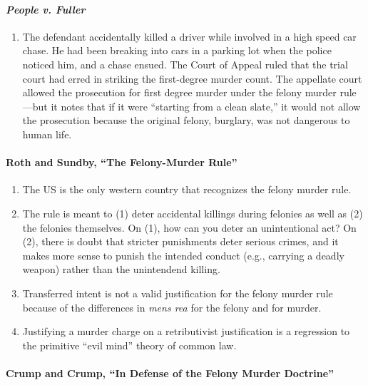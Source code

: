 \paragraph{\emph{People v. Fuller}} 

\begin{enumerate}
    \item The defendant accidentally killed a driver while involved in a high speed car chase. He had been breaking into cars in a parking lot when the police noticed him, and a chase ensued. The Court of Appeal ruled that the trial court had erred in striking the first-degree murder count. The appellate court allowed the prosecution for first degree murder under the felony murder rule---but it notes that if it were ``starting from a clean slate,'' it would not allow the prosecution because the original felony, burglary, was not dangerous to human life.
\end{enumerate}

\paragraph{Roth and Sundby, ``The Felony-Murder Rule''}

\begin{enumerate}
    \item The US is the only western country that recognizes the felony murder rule.
    \item The rule is meant to (1) deter accidental killings during felonies as well as (2) the felonies themselves. On (1), how can you deter an unintentional act? On (2), there is doubt that stricter punishments deter serious crimes, and it makes more sense to punish the intended conduct (e.g., carrying a deadly weapon) rather than the unintendend killing.
    \item Transferred intent is not a valid justification for the felony murder rule because of the differences in \emph{mens rea} for the felony and for murder.
    \item Justifying a murder charge on a retributivist justification is a regression to the primitive ``evil mind'' theory of common law.
\end{enumerate}

\paragraph{Crump and Crump, ``In Defense of the Felony Murder Doctrine''}

